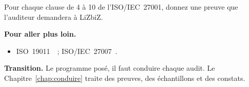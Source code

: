 \begin{boxexo}[title={\ding{45}\quad Exercice~12.10. Clauses 4 à 10 \niveauexpert}]
Pour chaque clause de 4 à 10 de l'ISO/IEC~27001, donnez une preuve que
l'auditeur demandera à LiZbiZ.
\end{boxexo}

\bigskip

\begin{boxinfo}
\textbf{Pour aller plus loin.}
\begin{itemize}
    \item ISO~19011~\cite{iso19011_2018}~; ISO/IEC~27007~\cite{iso27007_2020}.
\end{itemize}
\end{boxinfo}

\begin{boxinfo}
\textbf{Transition.} Le programme posé, il faut conduire chaque audit. Le
Chapitre~\ref{chap:conduire} traite des preuves, des échantillons et des
constats.
\end{boxinfo}
